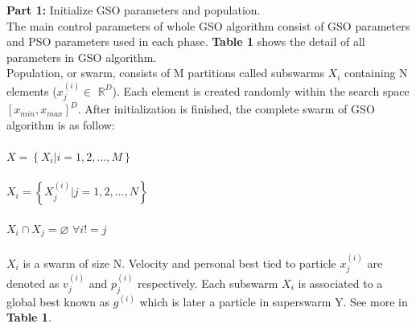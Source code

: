 \documentclass[a4paper]{article}
\begin{document}
\textbf{Part 1:} Initialize GSO parameters and population. \\
The main control parameters of whole GSO algorithm consist of GSO parameters and PSO parameters used in each phase. \textbf{Table 1} shows the detail of all parameters in GSO algorithm. \\
Population, or swarm, consists of M partitions called subswarms $X_i$ containing N elements ($x_j^{(i)}\in$ $\mathbb{R}^D$). Each element is created randomly within the search space $[x_{min}, x_{max}]^D$. After initialization is finished, the complete swarm of GSO algorithm is as follow: \\ \\
$X = \left\{X_i|  i = 1, 2, ..., M\right\}$ \\ \\
$X_i = \left\{X_j^{(i)}|   j = 1, 2, ..., N\right\}$ \\ \\
$X_i\cap X_j = \varnothing$ $  \forall i != j $ \\ \\
$X_i$ is a swarm of size N. Velocity and personal best tied to particle $x_j^{(i)}$ are denoted as $v_j^{(i)}$ and $p_j^{(i)}$ respectively. Each subswarm $X_i$ is associated to a global best known as $g^{(i)}$ which is later a particle in superswarm Y. See more in \textbf{Table 1}. \\
\end{document}
